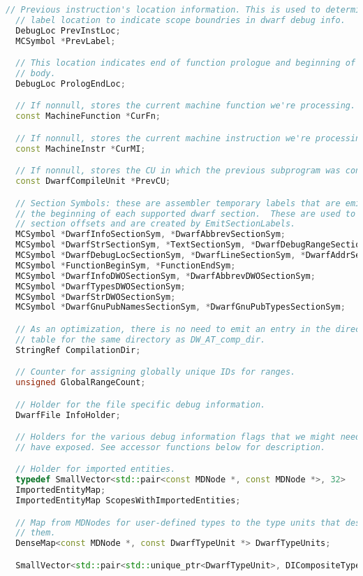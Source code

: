\documentclass{ctexart}
\begin{document}
\begin{lstlisting}[language=C++]
  // Previous instruction's location information. This is used to determine
  // label location to indicate scope boundries in dwarf debug info.
  DebugLoc PrevInstLoc;
  MCSymbol *PrevLabel;

  // This location indicates end of function prologue and beginning of function
  // body.
  DebugLoc PrologEndLoc;

  // If nonnull, stores the current machine function we're processing.
  const MachineFunction *CurFn;

  // If nonnull, stores the current machine instruction we're processing.
  const MachineInstr *CurMI;

  // If nonnull, stores the CU in which the previous subprogram was contained.
  const DwarfCompileUnit *PrevCU;

  // Section Symbols: these are assembler temporary labels that are emitted at
  // the beginning of each supported dwarf section.  These are used to form
  // section offsets and are created by EmitSectionLabels.
  MCSymbol *DwarfInfoSectionSym, *DwarfAbbrevSectionSym;
  MCSymbol *DwarfStrSectionSym, *TextSectionSym, *DwarfDebugRangeSectionSym;
  MCSymbol *DwarfDebugLocSectionSym, *DwarfLineSectionSym, *DwarfAddrSectionSym;
  MCSymbol *FunctionBeginSym, *FunctionEndSym;
  MCSymbol *DwarfInfoDWOSectionSym, *DwarfAbbrevDWOSectionSym;
  MCSymbol *DwarfTypesDWOSectionSym;
  MCSymbol *DwarfStrDWOSectionSym;
  MCSymbol *DwarfGnuPubNamesSectionSym, *DwarfGnuPubTypesSectionSym;

  // As an optimization, there is no need to emit an entry in the directory
  // table for the same directory as DW_AT_comp_dir.
  StringRef CompilationDir;

  // Counter for assigning globally unique IDs for ranges.
  unsigned GlobalRangeCount;

  // Holder for the file specific debug information.
  DwarfFile InfoHolder;

  // Holders for the various debug information flags that we might need to
  // have exposed. See accessor functions below for description.

  // Holder for imported entities.
  typedef SmallVector<std::pair<const MDNode *, const MDNode *>, 32>
  ImportedEntityMap;
  ImportedEntityMap ScopesWithImportedEntities;

  // Map from MDNodes for user-defined types to the type units that describe
  // them.
  DenseMap<const MDNode *, const DwarfTypeUnit *> DwarfTypeUnits;

  SmallVector<std::pair<std::unique_ptr<DwarfTypeUnit>, DICompositeType>, 1> TypeUnitsUnderConstruction;


\end{lstlisting}
\end{document}
